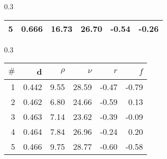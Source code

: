 \documentclass[uplatex,11pt,openany]{ujreport}
\begin{document}
\begin{landscape}
\begin{table*}[tb]
\begin{subtable}[h]{0.3\textwidth}
\begin{tabular}{rrrrrr}
                    \color{black} 5 & \color{black} 0.666 & {\cellcolor[HTML]{ADE0B0}} \color[HTML]{000000} \color{black} 16.73 & {\cellcolor[HTML]{9CDAA0}} \color[HTML]{000000} \color{black} 26.70 & {\cellcolor[HTML]{FEE3E3}} \color[HTML]{000000} \color{black} -0.54 & {\cellcolor[HTML]{FED2D2}} \color[HTML]{000000} \color{black} -0.26 \\
                    \bottomrule
                    \end{tabular}
                    \end{subtable}\hfill\begin{subtable}[h]{0.3\textwidth}
                    \centering
                    \caption{APS}
                    \label{table:best_genes_for_aps}
                    \begin{tabular}{rrrrrr}
                    \toprule
                    $\#$ & d & $\rho$ & $\nu$ & $r$ & $f$ \\
                    \midrule
                    \color{black} 1 & \color{black} 0.442 & {\cellcolor[HTML]{D2EED4}} \color[HTML]{000000} \color{black} 9.55 & {\cellcolor[HTML]{9CDAA0}} \color[HTML]{000000} \color{black} 28.59 & {\cellcolor[HTML]{FEDEDE}} \color[HTML]{000000} \color{black} -0.47 & {\cellcolor[HTML]{FFF2F2}} \color[HTML]{000000} \color{black} -0.79 \\
                    \color{black} 2 & \color{black} 0.462 & {\cellcolor[HTML]{E1F4E2}} \color[HTML]{000000} \color{black} 6.80 & {\cellcolor[HTML]{9CDAA0}} \color[HTML]{000000} \color{black} 24.66 & {\cellcolor[HTML]{FEE5E5}} \color[HTML]{000000} \color{black} -0.59 & {\cellcolor[HTML]{FDBABA}} \color[HTML]{000000} \color{black} 0.13 \\
                    \color{black} 3 & \color{black} 0.463 & {\cellcolor[HTML]{DFF3E0}} \color[HTML]{000000} \color{black} 7.14 & {\cellcolor[HTML]{9CDAA0}} \color[HTML]{000000} \color{black} 23.62 & {\cellcolor[HTML]{FED9D9}} \color[HTML]{000000} \color{black} -0.39 & {\cellcolor[HTML]{FEC7C7}} \color[HTML]{000000} \color{black} -0.09 \\
                    \color{black} 4 & \color{black} 0.464 & {\cellcolor[HTML]{DBF2DD}} \color[HTML]{000000} \color{black} 7.84 & {\cellcolor[HTML]{9CDAA0}} \color[HTML]{000000} \color{black} 26.96 & {\cellcolor[HTML]{FED1D1}} \color[HTML]{000000} \color{black} -0.24 & {\cellcolor[HTML]{FDB5B5}} \color[HTML]{000000} \color{black} 0.20 \\
                    \color{black} 5 & \color{black} 0.466 & {\cellcolor[HTML]{D2EED3}} \color[HTML]{000000} \color{black} 9.75 & {\cellcolor[HTML]{9CDAA0}} \color[HTML]{000000} \color{black} 28.77 & {\cellcolor[HTML]{FEE6E6}} \color[HTML]{000000} \color{black} -0.60 & {\cellcolor[HTML]{FEE5E5}} \color[HTML]{000000} \color{black} -0.58 \\

\end{tabular}
\end{subtable}
\end{table*}
\end{landscape}
\end{document}
